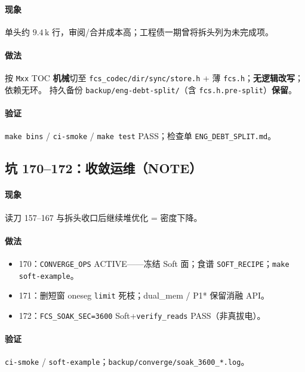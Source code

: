 \paragraph{现象}
单头约 $9.4\,\mathrm{k}$ 行，审阅/合并成本高；工程债一期曾将拆头列为未完成项。

\paragraph{做法}
按 \texttt{Mxx} TOC \textbf{机械}切至 \texttt{fcs\_codec/dir/sync/store.h} + 薄 \texttt{fcs.h}；\textbf{无逻辑改写}；依赖无环。
持久备份 \texttt{backup/eng-debt-split/}（含 \texttt{fcs.h.pre-split}）\textbf{保留}。

\paragraph{验证}
\texttt{make bins} / \texttt{ci-smoke} / \texttt{make test} PASS；检查单 \texttt{ENG\_DEBT\_SPLIT.md}。

\subsection{坑 170--172：收敛运维（NOTE）}
\paragraph{现象}
读刀 157--167 与拆头收口后继续堆优化 = 密度下降。

\paragraph{做法}
\begin{itemize}[leftmargin=1.4em]
  \item 170：\texttt{CONVERGE\_OPS} ACTIVE——冻结 Soft 面；食谱 \texttt{SOFT\_RECIPE}；\texttt{make soft-example}。
  \item 171：删短窗 oneseg \texttt{limit} 死枝；dual\_mem / P1* 保留消融 API。
  \item 172：\texttt{FCS\_SOAK\_SEC=3600} Soft+\texttt{verify\_reads} PASS（非真拔电）。
\end{itemize}

\paragraph{验证}
\texttt{ci-smoke} / \texttt{soft-example}；\texttt{backup/converge/soak\_3600\_*.log}。

